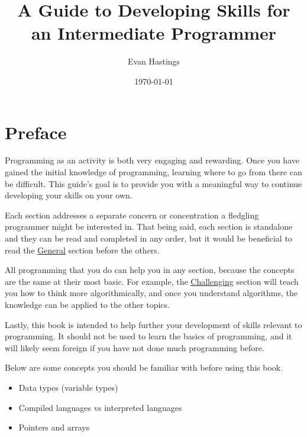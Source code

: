 \documentclass[12pt, oneside, a4paper]{book}
\title{A Guide to Developing Skills for an Intermediate Programmer}
\date{\today}
\author{Evan Hastings}
\begin{document}
   \maketitle
   \newpage
   \tableofcontents
   \lstlistoflistings
   \listoftables

   \chapter*{Preface}
      Programming as an activity is both very engaging and rewarding.
      Once you have gained the initial knowledge of programming, learning where to go from there can be difficult.
      This guide's goal is to provide you with a meaningful way to continue developing your skills on your own.

      Each section addresses a separate concern or concentration a fledgling programmer might be interested in.
      That being said, each section is standalone and they can be read and completed in any order, but it would be beneficial to read the \hyperref[chap:general]{General} section before the others.

      All programming that you do can help you in any section, because the concepts are the same at their most basic.
      For example, the \hyperref[chap:challenge]{Challenging} section will teach you how to think more algorithmically, and once you understand algorithms, the knowledge can be applied to the other topics.

      Lastly, this book is intended to help further your development of skills relevant to programming.
      It should not be used to learn the basics of programming, and it will likely seem foreign if you have not done much programming before.

      Below are some concepts you should be familiar with before using this book\footnotemark.

      \begin{itemize}
         \item Data types (variable types)
         \item Compiled languages vs interpreted languages
         \item Pointers and arrays
      \end{itemize}
\end{document}
